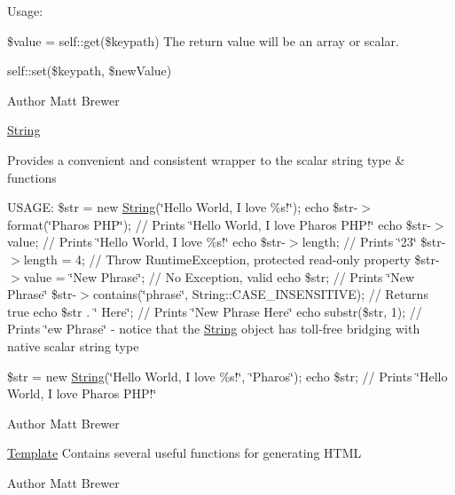 Usage:

\$value = self::get(\$keypath) The return value will be an array or scalar.

self::set(\$keypath, \$newValue)

\begin{DoxyAuthor}{Author}
Matt Brewer
\end{DoxyAuthor}
\hyperlink{class_string}{String}

Provides a convenient and consistent wrapper to the scalar string type \& functions

USAGE: \$str = new \hyperlink{class_string}{String}(\char`\"{}Hello World, I love \%s!\char`\"{}); echo \$str-\/$>$format(\char`\"{}Pharos PHP\char`\"{}); // Prints \char`\"{}Hello World, I love Pharos PHP!\char`\"{} echo \$str-\/$>$value; // Prints \char`\"{}Hello World, I love \%s!\char`\"{} echo \$str-\/$>$length; // Prints \char`\"{}23\char`\"{} \$str-\/$>$length = 4; // Throw RuntimeException, protected read-\/only property \$str-\/$>$value = \char`\"{}New Phrase\char`\"{}; // No Exception, valid echo \$str; // Prints \char`\"{}New Phrase\char`\"{} \$str-\/$>$contains(\char`\"{}phrase\char`\"{}, String::CASE\_\-INSENSITIVE); // Returns true echo \$str . \char`\"{} Here\char`\"{}; // Prints \char`\"{}New Phrase Here\char`\"{} echo substr(\$str, 1); // Prints \char`\"{}ew Phrase\char`\"{} -\/ notice that the \hyperlink{class_string}{String} object has toll-\/free bridging with native scalar string type

\$str = new \hyperlink{class_string}{String}(\char`\"{}Hello World, I love \%s!\char`\"{}, \char`\"{}Pharos\char`\"{}); echo \$str; // Prints \char`\"{}Hello World, I love Pharos PHP!\char`\"{}

\begin{DoxyAuthor}{Author}
Matt Brewer
\end{DoxyAuthor}
\hyperlink{class_template}{Template} Contains several useful functions for generating HTML

\begin{DoxyAuthor}{Author}
Matt Brewer 
\end{DoxyAuthor}
